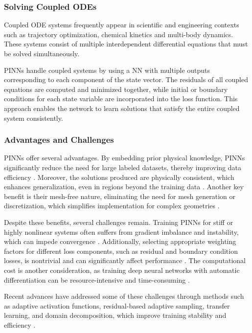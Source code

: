 \documentclass[
  number,
  preprint]{elsarticle}
\begin{document}
\subsubsection{Solving Coupled ODEs}\label{solving-coupled-odes}

Coupled ODE systems frequently appear in scientific and engineering
contexts such as trajectory optimization, chemical kinetics and
multi-body dynamics. These systems consist of multiple interdependent
differential equations that must be solved simultaneously.

PINNs handle coupled systems by using a NN with multiple outputs
corresponding to each component of the state vector. The residuals of
all coupled equations are computed and minimized together, while initial
or boundary conditions for each state variable are incorporated into the
loss function. This approach enables the network to learn solutions that
satisfy the entire coupled system consistently.

\subsubsection{Advantages and
Challenges}\label{advantages-and-challenges}

PINNs offer several advantages. By embedding prior physical knowledge,
PINNs significantly reduce the need for large labeled datasets, thereby
improving data efficiency
\citep{raissi2019physics, karniadakis2021physics}. Moreover, the
solutions produced are physically consistent, which enhances
generalization, even in regions beyond the training data
\citep{cuomo2022scientific}. Another key benefit is their mesh-free
nature, eliminating the need for mesh generation or discretization,
which simplifies implementation for complex geometries
\citep{raissi2019physics}.

Despite these benefits, several challenges remain. Training PINNs for
stiff or highly nonlinear systems often suffers from gradient imbalance
and instability, which can impede convergence
\citep{wang2021understanding, lu2021deepxde}. Additionally, selecting
appropriate weighting factors for different loss components, such as
residual and boundary condition losses, is nontrivial and can
significantly affect performance \citep{mcclenny2020self}. The
computational cost is another consideration, as training deep neural
networks with automatic differentiation can be resource-intensive and
time-consuming \citep{shukla2021parallel}.

Recent advances have addressed some of these challenges through methods
such as adaptive activation functions, residual-based adaptive sampling,
transfer learning, and domain decomposition, which improve training
stability and efficiency
\citep{mcclenny2020self, shukla2021parallel, lu2021deepxde}.
\end{document}

